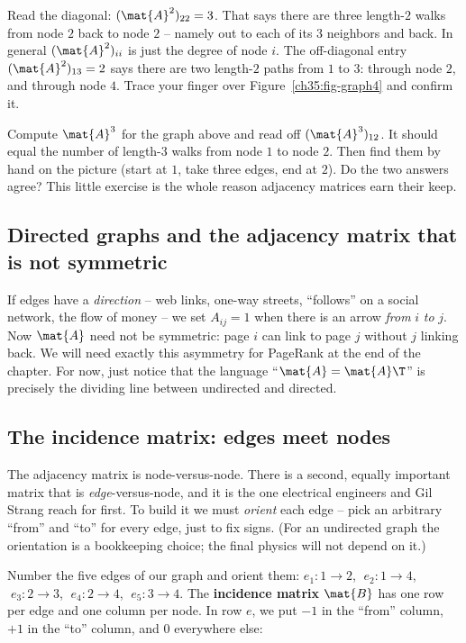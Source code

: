 Read the diagonal: $(\mat{A}^2)_{22} = 3$. That says there are three length-$2$ walks from
node $2$ back to node $2$ -- namely out to each of its $3$ neighbors and back. In general
$(\mat{A}^2)_{ii}$ is just the degree of node $i$. The off-diagonal entry
$(\mat{A}^2)_{13} = 2$ says there are two length-$2$ paths from $1$ to $3$: through node
$2$, and through node $4$. Trace your finger over Figure~\ref{ch35:fig-graph4} and confirm
it.

\begin{labbox}
Compute $\mat{A}^3$ for the graph above and read off $(\mat{A}^3)_{12}$. It should equal
the number of length-$3$ walks from node $1$ to node $2$. Then find them by hand on the
picture (start at $1$, take three edges, end at $2$). Do the two answers agree? This little
exercise is the whole reason adjacency matrices earn their keep.
\end{labbox}

\subsection{Directed graphs and the adjacency matrix that is not symmetric}

If edges have a \emph{direction} -- web links, one-way streets, ``follows'' on a social
network, the flow of money -- we set $A_{ij}=1$ when there is an arrow \emph{from} $i$
\emph{to} $j$. Now $\mat{A}$ need not be symmetric: page $i$ can link to page $j$ without
$j$ linking back. We will need exactly this asymmetry for PageRank at the end of the
chapter. For now, just notice that the language ``$\mat{A}=\mat{A}\T$'' is precisely the
dividing line between undirected and directed.

\subsection{The incidence matrix: edges meet nodes}
\label{ch35:incidence}

The adjacency matrix is node-versus-node. There is a second, equally important matrix that
is \emph{edge}-versus-node, and it is the one electrical engineers and Gil Strang reach for
first. To build it we must \emph{orient} each edge -- pick an arbitrary ``from'' and ``to''
for every edge, just to fix signs. (For an undirected graph the orientation is a
bookkeeping choice; the final physics will not depend on it.)

Number the five edges of our graph and orient them:
$e_1: 1\!\to\!2$, $\;e_2: 1\!\to\!4$, $\;e_3: 2\!\to\!3$, $\;e_4: 2\!\to\!4$,
$\;e_5: 3\!\to\!4$. The \textbf{incidence matrix} $\mat{B}$ has one row per edge and one
column per node. In row $e$, we put $-1$ in the ``from'' column, $+1$ in the ``to''
column, and $0$ everywhere else:

